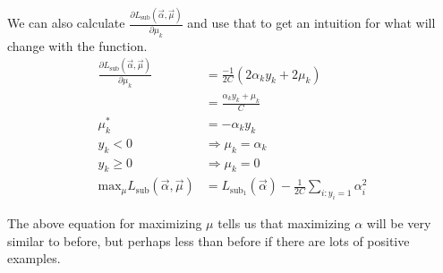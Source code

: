 \documentclass[12pt]{article}
\begin{document}
\begin{enumerate}
\begin{enumerate}
We can also calculate $\frac{\partial L_{\text{sub}}\left(\vec{\alpha},\vec{\mu}\right)}{\partial \mu_k}$ and use that to get an intuition for what will change with the function. 
\begin{align*}
\frac{\partial L_{\text{sub}}\left(\vec{\alpha},\vec{\mu}\right)}{\partial \mu_k} &= \frac{-1}{2C} \left( 2 \alpha_k y_k + 2 \mu_k \right) \\
&= \frac{\alpha_k y_k + \mu_k}{C}\\
\mu^*_k &= -\alpha_k y_k \\
y_k < 0 &\Rightarrow \mu_k = \alpha_k \\
y_k \geq 0 &\Rightarrow \mu_k = 0 \\
\text{max}_{\mu} L_{\text{sub}}\left(\vec{\alpha},\vec{\mu}\right) &= L_{\text{sub}_1}\left(\vec{\alpha}\right) - \frac{1}{2C}\sum_{i: y_i = 1} \alpha_i^2 
\end{align*}

The above equation for maximizing $\mu$ tells us that maximizing $\alpha$ will be very similar to before, but perhaps less than before if there are lots of positive examples.

\end{enumerate}
\end{enumerate}
\end{document}
